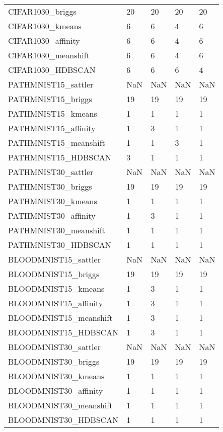 \begin{tabular}{lllll}
CIFAR1030_briggs & 20 & 20 & 20 & 20 \\
CIFAR1030_kmeans & 6 & 6 & 4 & 6 \\
CIFAR1030_affinity & 6 & 6 & 4 & 6 \\
CIFAR1030_meanshift & 6 & 6 & 4 & 6 \\
CIFAR1030_HDBSCAN & 6 & 6 & 6 & 4 \\
PATHMNIST15_sattler & NaN & NaN & NaN & NaN \\
PATHMNIST15_briggs & 19 & 19 & 19 & 19 \\
PATHMNIST15_kmeans & 1 & 1 & 1 & 1 \\
PATHMNIST15_affinity & 1 & 3 & 1 & 1 \\
PATHMNIST15_meanshift & 1 & 1 & 3 & 1 \\
PATHMNIST15_HDBSCAN & 3 & 1 & 1 & 1 \\
PATHMNIST30_sattler & NaN & NaN & NaN & NaN \\
PATHMNIST30_briggs & 19 & 19 & 19 & 19 \\
PATHMNIST30_kmeans & 1 & 1 & 1 & 1 \\
PATHMNIST30_affinity & 1 & 3 & 1 & 1 \\
PATHMNIST30_meanshift & 1 & 1 & 1 & 1 \\
PATHMNIST30_HDBSCAN & 1 & 1 & 1 & 1 \\
BLOODMNIST15_sattler & NaN & NaN & NaN & NaN \\
BLOODMNIST15_briggs & 19 & 19 & 19 & 19 \\
BLOODMNIST15_kmeans & 1 & 3 & 1 & 1 \\
BLOODMNIST15_affinity & 1 & 3 & 1 & 1 \\
BLOODMNIST15_meanshift & 1 & 3 & 1 & 1 \\
BLOODMNIST15_HDBSCAN & 1 & 3 & 1 & 1 \\
BLOODMNIST30_sattler & NaN & NaN & NaN & NaN \\
BLOODMNIST30_briggs & 19 & 19 & 19 & 19 \\
BLOODMNIST30_kmeans & 1 & 1 & 1 & 1 \\
BLOODMNIST30_affinity & 1 & 1 & 1 & 1 \\
BLOODMNIST30_meanshift & 1 & 1 & 1 & 1 \\
BLOODMNIST30_HDBSCAN & 1 & 1 & 1 & 1 \\
\bottomrule
\end{tabular}
